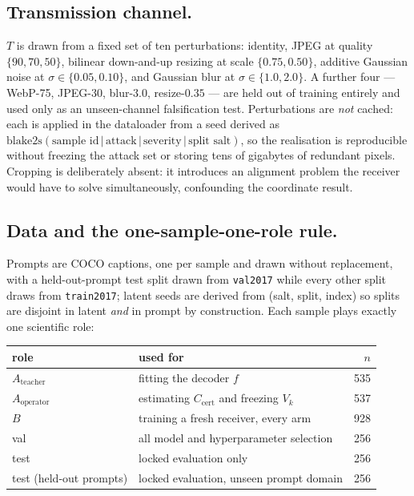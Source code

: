 \documentclass{article}
\theoremstyle{definition}
\newcommand{\Ccert}{C_{\mathrm{cert}}}
\begin{document}
\subsection*{Transmission channel.}
$T$ is drawn from a fixed set of ten perturbations: identity, JPEG at quality
$\{90,70,50\}$, bilinear down-and-up resizing at scale $\{0.75,0.50\}$, additive Gaussian
noise at $\sigma\in\{0.05,0.10\}$, and Gaussian blur at $\sigma\in\{1.0,2.0\}$. A further
four --- WebP-75, JPEG-30, blur-$3.0$, resize-$0.35$ --- are held out of training entirely
and used only as an unseen-channel falsification test. Perturbations are \emph{not}
cached: each is applied in the dataloader from a seed derived as
$\mathrm{blake2s}(\text{sample id}\,|\,\text{attack}\,|\,\text{severity}\,|\,\text{split
salt})$, so the realisation is reproducible without freezing the attack set or storing
tens of gigabytes of redundant pixels. Cropping is deliberately absent: it introduces an
alignment problem the receiver would have to solve simultaneously, confounding the
coordinate result.

\subsection*{Data and the one-sample-one-role rule.}
Prompts are COCO captions, one per sample and drawn without replacement, with a
held-out-prompt test split drawn from \texttt{val2017} while every other split draws from
\texttt{train2017}; latent seeds are derived from (salt, split, index) so splits are
disjoint in latent \emph{and} in prompt by construction. Each sample plays exactly one
scientific role:

\begin{center}
\begin{tabular}{llr}
\toprule
role & used for & $n$ \\
\midrule
$A_{\mathrm{teacher}}$ & fitting the decoder $f$ & 535 \\
$A_{\mathrm{operator}}$ & estimating $\Ccert$ and freezing $V_k$ & 537 \\
$B$ & training a fresh receiver, every arm & 928 \\
val & all model and hyperparameter selection & 256 \\
test & locked evaluation only & 256 \\
test (held-out prompts) & locked evaluation, unseen prompt domain & 256 \\
\bottomrule
\end{tabular}
\end{center}
\end{document}
